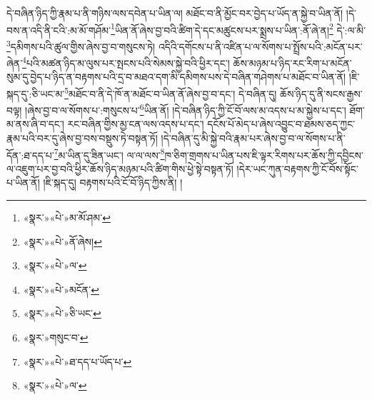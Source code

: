 དེ་བཞིན་ཉིད་ཀྱི་རྣམ་པ་ནི་གཉིས་ལས་དབེན་པ་ཡིན་ལ། མཐོང་བ་ནི་མྱོང་བར་བྱེད་པ་ཡོད་ན་སྐྱེ་བ་ཡིན་ནོ། །དེ་བས་ན་འདི་ནི་ངའི་:མ་མོ་གཤོམ་\footnote{«སྣར་»«པེ་»མ་མོ་ཤམ་}ཡིན་ནོ་ཞེས་བྱ་བའི་ཚིག་དེ་དང་མཚུངས་པར་སྨྲས་པ་ཡིན་:ནོ་ཞེ་ན།\footnote{«སྣར་»«པེ་»ནོ་ཞེས།} དེ་:ལ་མི་\footnote{«སྣར་»«པེ་»ལ་}དམིགས་པའི་ཚུལ་གྱིས་ཞེས་བྱ་བ་གསུངས་ཏེ། འདིའི་དགོངས་པ་ནི་འཛིན་པ་ལ་སོགས་པ་སྤྲོས་པའི་:མངོན་པར་ཞེན་\footnote{«སྣར་»«པེ་»མངོན་}པའི་མཚན་ཉིད་མ་ལུས་པར་སྤངས་པའི་སེམས་སྐྱེ་བའི་ཕྱིར་དང་། ཆོས་མཉམ་པ་ཉིད་རང་རིག་པ་མངོན་སུམ་དུ་བྱེད་པ་ཉིད་ན་བརྟགས་པའི་དྲ་བ་མཐའ་དག་མི་དམིགས་པས་དེ་བཞིན་གཤེགས་པ་མཐོང་བ་ཡིན་ནོ། །ཇི་སྐད་དུ་:ཅི་ཡང་མ་\footnote{«སྣར་»«པེ་»ཅི་ཡང་}མཐོང་བ་ནི་དེ་ཁོ་ན་མཐོང་བ་ཡིན་ནོ་ཞེས་བྱ་བ་དང་། དེ་བཞིན་དུ། ཆོས་ཉིད་དུ་ནི་སངས་རྒྱས་བལྟ། །ཞེས་བྱ་བ་ལ་སོགས་པ་:གསུངས་པ་\footnote{«སྣར་»གསུང་བ་}ཡིན་ནོ། །དེ་བཞིན་ཉིད་ཀྱི་ངོ་བོ་ལས་མ་འདས་པ་མ་སྐྱེས་པ་དང་། ཐོག་མ་ནས་ཞི་བ་དང་། རང་བཞིན་གྱིས་མྱ་ངན་ལས་འདས་པ་དང་། དངོས་པོ་མེད་པ་ཞེས་འབྱུང་བ་ཐམས་ཅད་ཀྱང་རྣམ་པའི་བར་དུ་ཞེས་བྱ་བས་བསྡུས་ཏེ་བསྟན་ཏོ། །དེ་བཞིན་དུ་མི་སྐྱེ་བའི་རྣམ་པར་ཞེས་བྱ་བ་ལ་སོགས་པ་ནི་དོན་:ཐ་དད་པ་\footnote{«སྣར་»«པེ་»ཐ་དད་པ་ཡོད་པ་}མ་ཡིན་དུ་ཟིན་ཡང་། ལ་ལ་ལས་\footnote{«སྣར་»«པེ་»ལ་}ཁ་ཅིག་གྲགས་པ་ཡིན་པས་ཇི་ལྟར་རིགས་པར་ཆོས་ཀྱི་དབྱིངས་ལ་འཇུག་པར་བྱ་བའི་ཕྱིར་ཆོས་ཉིད་མཉམ་པའི་ཚིག་གིས་ཕྱེ་སྟེ་བསྟན་ཏོ། །དེར་ཡང་ཀུན་བརྟགས་ཀྱི་ངོ་བོས་སྟོང་པ་ཡིན་ནོ། །ཇི་སྐད་དུ། བརྟགས་པའི་ངོ་བོ་ཉིད་ཀྱིས་ནི། །

